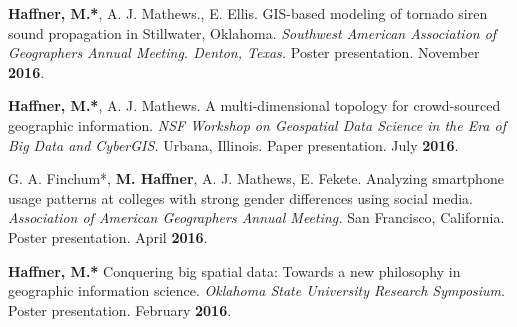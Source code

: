 \begin{cventries}
   \cventry
      {}
      {}
      {}
      {}
      {
        \begin{cvitems}
          \vspace{-2mm}
        \item {\textbf{Haffner, M.*}, A. J. Mathews., E. Ellis. GIS-based
            modeling of tornado siren sound propagation in Stillwater, Oklahoma.
            \textit{Southwest American Association of Geographers Annual
              Meeting. Denton, Texas.} Poster presentation. November
            \textbf{2016}.}
            \end{cvitems}
          } %

   \cventry
      {}
      {}
      {}
      {}
      {
        \begin{cvitems}
          \vspace{-2mm}
        \item {\textbf{Haffner, M.*}, A. J. Mathews. A multi-dimensional
            topology for crowd-sourced geographic information. \textit{NSF
              Workshop on Geospatial Data Science in the Era of Big Data and
              CyberGIS.} Urbana, Illinois. Paper presentation. July
            \textbf{2016}.}
          \end{cvitems}
        }

   \cventry
      {}
      {}
      {}
      {}
      {
        \begin{cvitems}
          \vspace{-2mm}
        \item G. A. Finchum*, {\textbf{M. Haffner}, A. J. Mathews, E. Fekete.
            Analyzing smartphone usage patterns at colleges with strong gender
            differences using social media. \textit{Association of American
              Geographers Annual Meeting.} San Francisco, California. Poster
            presentation. April \textbf{2016}.}
            \end{cvitems}
            }

   \cventry
      {}
      {}
      {}
      {}
      {
        \begin{cvitems}
          \vspace{-2mm}
        \item {\textbf{Haffner, M.*} Conquering big spatial data: Towards a new
            philosophy in geographic information science. \textit{Oklahoma State
              University Research Symposium}. Poster presentation. February
            \textbf{2016}.}
              \end{cvitems}
            }


\end{cventries}
